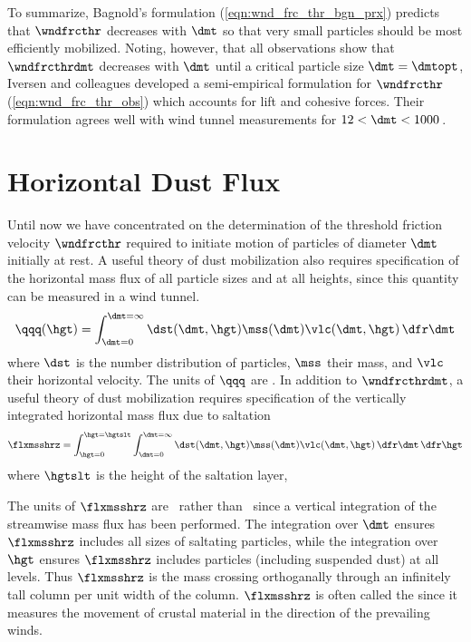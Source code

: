 \documentclass[12pt,twoside]{book}
\begin{document}
To summarize, Bagnold's formulation (\ref{eqn:wnd_frc_thr_bgn_prx})
predicts that $\wndfrcthr$ decreases with $\dmt$ so that very small
particles should be most efficiently mobilized. 
Noting, however, that all observations show that $\wndfrcthrdmt$
decreases with $\dmt$ until a critical particle size $\dmt =
\dmtopt$, Iversen and colleagues developed a semi-empirical
formulation for $\wndfrcthr$ (\ref{eqn:wnd_frc_thr_obs}) which
accounts for lift and cohesive forces. 
Their formulation agrees well with wind tunnel measurements for $12 <
\dmt < 1000$\,\um. 

\section{Horizontal Dust Flux}\label{sxn:hrz}
Until now we have concentrated on the determination of the threshold
friction velocity $\wndfrcthr$ required to initiate motion of
particles of diameter $\dmt$ initially at rest. 
A useful theory of dust mobilization also requires specification of
the horizontal mass flux of all particle sizes and at all heights,
since this quantity can be measured in a wind tunnel.
\begin{equation}
\qqq(\hgt) = \int_{\dmt = 0}^{\dmt = \infty} 
\dst(\dmt,\hgt) \mss(\dmt) \vlc(\dmt,\hgt) \,\dfr\dmt
\label{eqn:flx_hrz_dfn_4}
\end{equation}
where $\dst$ is the number distribution of particles, $\mss$ their
mass, and $\vlc$ their horizontal velocity.
The units of $\qqq$ are \kgxmSs.
In addition to $\wndfrcthrdmt$, 
a useful theory of dust mobilization
requires specification of the vertically integrated horizontal mass
flux due to saltation 
\begin{equation}
\flxmsshrz = \int_{\hgt = 0}^{\hgt = \hgtslt} \int_{\dmt = 0}^{\dmt =
\infty} \dst(\dmt,\hgt) \mss(\dmt) \vlc(\dmt,\hgt) \,\dfr\dmt \,\dfr\hgt 
\label{eqn:flx_hrz_dfn}
\end{equation}
where $\hgtslt$ is the height of the saltation layer, 

The units of $\flxmsshrz$ are \kgxms\ rather than \kgxmSs\ since a
vertical integration of the streamwise mass flux has been performed.
The integration over $\dmt$ ensures $\flxmsshrz$ includes all sizes of
saltating particles, while the integration over $\hgt$ ensures
$\flxmsshrz$ includes particles (including suspended dust) at all levels.  
Thus $\flxmsshrz$ is the mass crossing orthoganally through an
infinitely tall column per unit width of the column.
$\flxmsshrz$ is often called the  since
it measures the movement of crustal material in the direction of the
prevailing winds. 
\end{document}
